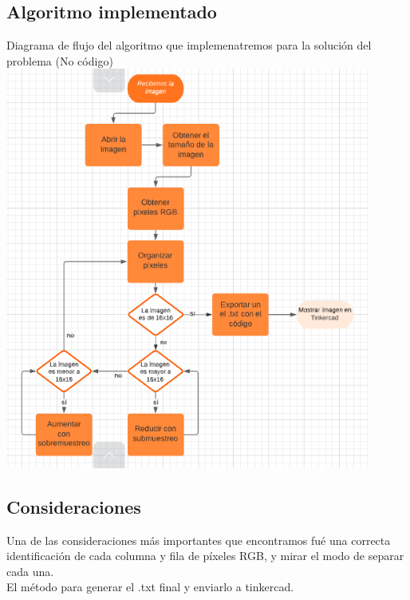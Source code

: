 \documentclass{article}
\begin{document}
\subsection{Algoritmo implementado}
Diagrama de flujo del algoritmo que implemenatremos para la solución del problema (No código)\\
\includegraphics[width=12cm]{Imagenes/Algo.png}

\subsection{Consideraciones}
Una de las consideraciones más importantes que encontramos fué una correcta identificación de cada columna y fila de píxeles RGB, y mirar el modo de separar cada una.\\
El método para generar el .txt final y enviarlo a tinkercad.\\
\end{document}
